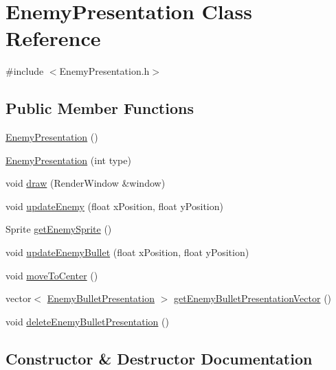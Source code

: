 \hypertarget{class_enemy_presentation}{}\section{Enemy\+Presentation Class Reference}
\label{class_enemy_presentation}


{\ttfamily \#include $<$Enemy\+Presentation.\+h$>$}

\subsection*{Public Member Functions}
\begin{DoxyCompactItemize}
\item 
\hyperlink{class_enemy_presentation_aa17b851454a7bc3a86a6c20e803f5e76}{Enemy\+Presentation} ()
\item 
\hyperlink{class_enemy_presentation_a78e7f250c31e2e6d6327ead1ef12f4c8}{Enemy\+Presentation} (int type)
\item 
void \hyperlink{class_enemy_presentation_a9af0b870bea65e9fa170f6eb20394265}{draw} (Render\+Window \&window)
\item 
void \hyperlink{class_enemy_presentation_adc38a8f56b24ec4aea9157dd74884b40}{update\+Enemy} (float x\+Position, float y\+Position)
\item 
Sprite \hyperlink{class_enemy_presentation_a9b88f3f215f5f94028f732005c68daa9}{get\+Enemy\+Sprite} ()
\item 
void \hyperlink{class_enemy_presentation_ad7d1f196be857ea51b2ced17b5199b40}{update\+Enemy\+Bullet} (float x\+Position, float y\+Position)
\item 
void \hyperlink{class_enemy_presentation_a8e6b10042366b1af3ddd99878cae36a9}{move\+To\+Center} ()
\item 
vector$<$ \hyperlink{class_enemy_bullet_presentation}{Enemy\+Bullet\+Presentation} $>$ \hyperlink{class_enemy_presentation_a64c5863ad2f83c1414cf69882293e4b9}{get\+Enemy\+Bullet\+Presentation\+Vector} ()
\item 
void \hyperlink{class_enemy_presentation_abad20ddfb250e1c31a4d4581fa7d2571}{delete\+Enemy\+Bullet\+Presentation} ()
\end{DoxyCompactItemize}


\subsection{Constructor \& Destructor Documentation}
\mbox{\label{class_enemy_presentation_aa17b851454a7bc3a86a6c20e803f5e76}} 
